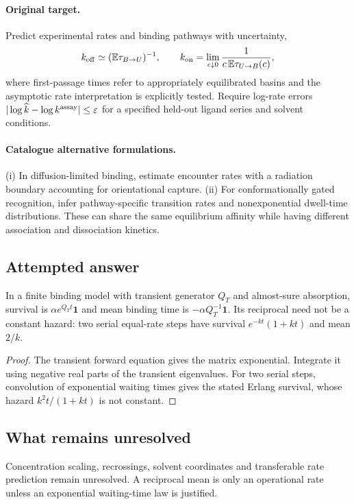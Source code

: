 \documentclass[11pt]{article}
\begin{document}
\paragraph{Original target.}
Predict experimental rates and binding pathways with uncertainty,
\[k_{\rm off}\simeq(\mathbb{E}\tau_{B\to U})^{-1},\qquad k_{\rm on}=\lim_{c\downarrow0}\frac{1}{c\,\mathbb{E}\tau_{U\to B}(c)},\]
where first-passage times refer to appropriately equilibrated basins and the asymptotic rate interpretation is explicitly tested. Require log-rate errors $|\log\widehat k-\log k^{\rm assay}|\le\varepsilon$ for a specified held-out ligand series and solvent conditions.
\paragraph{Catalogue alternative formulations.}
(i) In diffusion-limited binding, estimate encounter rates with a radiation boundary accounting for orientational capture. (ii) For conformationally gated recognition, infer pathway-specific transition rates and nonexponential dwell-time distributions. These can share the same equilibrium affinity while having different association and dissociation kinetics.
\subsection{Attempted answer}
\begin{proposition}
In a finite binding model with transient generator $Q_T$ and almost-sure absorption, survival is $\alpha e^{Q_Tt}\mathbf1$ and mean binding time is $-\alpha Q_T^{-1}\mathbf1$. Its reciprocal need not be a constant hazard: two serial equal-rate steps have survival $e^{-kt}(1+kt)$ and mean $2/k$.
\end{proposition}
\begin{proof}
The transient forward equation gives the matrix exponential. Integrate it using negative real parts of the transient eigenvalues. For two serial steps, convolution of exponential waiting times gives the stated Erlang survival, whose hazard $k^2t/(1+kt)$ is not constant.
\end{proof}
\subsection{What remains unresolved}
Concentration scaling, recrossings, solvent coordinates and transferable rate prediction remain unresolved. A reciprocal mean is only an operational rate unless an exponential waiting-time law is justified.
\end{document}
